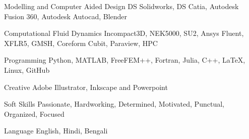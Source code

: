 

\begin{cvskills}

  \cvskill
  {Modelling and Computer Aided Design} %
  {DS Solidworks, DS Catia, Autodesk Fusion 360, Autodesk Autocad, Blender} %

  \cvskill
  {Computational Fluid Dynamics} %
  {Incompact3D, NEK5000, SU2, Ansys Fluent, XFLR5, GMSH, Coreform Cubit, Paraview, HPC} %

  \cvskill
  {Programming} %
  {Python, MATLAB, FreeFEM++, Fortran, Julia, C++, LaTeX, Linux, GitHub} %

  \cvskill
  {Creative} %
  {Adobe Illustrator, Inkscape and Powerpoint} %

  \cvskill
  {Soft Skills} %
  {Passionate, Hardworking, Determined, Motivated, Punctual, Organized, Focused} %


  \cvskill
  {Language} %
  {English, Hindi, Bengali} %

\end{cvskills}
